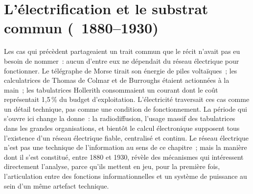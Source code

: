 \section{L'électrification et le substrat commun (~1880--1930)}\label{sec:electrification}


Les cas qui précèdent partageaient un trait commun que le récit n'avait pas eu besoin de nommer~: aucun d'entre eux ne dépendait du réseau électrique pour fonctionner. Le télégraphe de Morse tirait son énergie de piles voltaïques~; les calculatrices de Thomas de Colmar et de Burroughs étaient actionnées à la main~; les tabulatrices Hollerith consommaient un courant dont le coût représentait 1,5\,\% du budget d'exploitation. L'électricité traversait ces cas comme un détail technique, pas comme une condition de fonctionnement. La période qui s'ouvre ici change la donne~: la radiodiffusion, l'usage massif des tabulatrices dans les grandes organisations, et bientôt le calcul électronique supposent tous l'existence d'un réseau électrique fiable, centralisé et continu. Le réseau électrique n'est pas une technique de l'information au sens de ce chapitre~; mais la manière dont il s'est constitué, entre 1880 et 1930, révèle des mécanismes qui intéressent directement l'analyse, parce qu'ils mettent en jeu, pour la première fois, l'articulation entre des fonctions informationnelles et un système de puissance au sein d'un même artefact technique.

